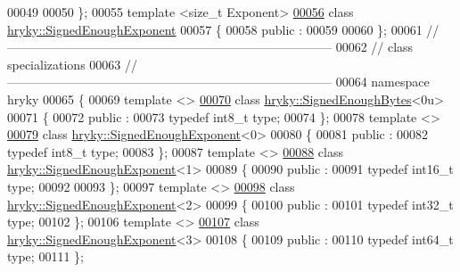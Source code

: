\begin{DoxyCode}
00049 
00050 \};
00055 \textcolor{keyword}{template} <\textcolor{keywordtype}{size\_t} Exponent>
\hypertarget{signed__enough_8h_source_l00056}{}\hyperlink{classhryky_1_1_signed_enough_exponent}{00056} \textcolor{keyword}{class }\hyperlink{classhryky_1_1_signed_enough_exponent}{hryky::SignedEnoughExponent}
00057 \{
00058 \textcolor{keyword}{public} :
00059 
00060 \};
00061 \textcolor{comment}{//
      ------------------------------------------------------------------------------}
00062 \textcolor{comment}{// class specializations}
00063 \textcolor{comment}{//
      ------------------------------------------------------------------------------}
00064 \textcolor{keyword}{namespace }hryky
00065 \{
00069 \textcolor{keyword}{template} <>
\hypertarget{signed__enough_8h_source_l00070}{}\hyperlink{classhryky_1_1hryky_1_1_signed_enough_bytes_3_010u_01_4}{00070} \textcolor{keyword}{class }\hyperlink{classhryky_1_1_signed_enough_bytes}{hryky::SignedEnoughBytes}<0u>
00071 \{
00072 \textcolor{keyword}{public} :
00073     \textcolor{keyword}{typedef} int8\_t type;
00074 \};
00078 \textcolor{keyword}{template} <>
\hypertarget{signed__enough_8h_source_l00079}{}\hyperlink{classhryky_1_1hryky_1_1_signed_enough_exponent_3_010_01_4}{00079} \textcolor{keyword}{class }\hyperlink{classhryky_1_1_signed_enough_exponent}{hryky::SignedEnoughExponent}<0>
00080 \{
00081 \textcolor{keyword}{public} :
00082     \textcolor{keyword}{typedef} int8\_t type;
00083 \};
00087 \textcolor{keyword}{template} <>
\hypertarget{signed__enough_8h_source_l00088}{}\hyperlink{classhryky_1_1hryky_1_1_signed_enough_exponent_3_011_01_4}{00088} \textcolor{keyword}{class }\hyperlink{classhryky_1_1_signed_enough_exponent}{hryky::SignedEnoughExponent}<1>
00089 \{
00090 \textcolor{keyword}{public} :
00091     \textcolor{keyword}{typedef} int16\_t type;
00092 
00093 \};
00097 \textcolor{keyword}{template} <>
\hypertarget{signed__enough_8h_source_l00098}{}\hyperlink{classhryky_1_1hryky_1_1_signed_enough_exponent_3_012_01_4}{00098} \textcolor{keyword}{class }\hyperlink{classhryky_1_1_signed_enough_exponent}{hryky::SignedEnoughExponent}<2>
00099 \{
00100 \textcolor{keyword}{public} :
00101     \textcolor{keyword}{typedef} int32\_t type;
00102 \};
00106 \textcolor{keyword}{template} <>
\hypertarget{signed__enough_8h_source_l00107}{}\hyperlink{classhryky_1_1hryky_1_1_signed_enough_exponent_3_013_01_4}{00107} \textcolor{keyword}{class }\hyperlink{classhryky_1_1_signed_enough_exponent}{hryky::SignedEnoughExponent}<3>
00108 \{
00109 \textcolor{keyword}{public} :
00110     \textcolor{keyword}{typedef} int64\_t type;
00111 \};

\end{DoxyCode}
